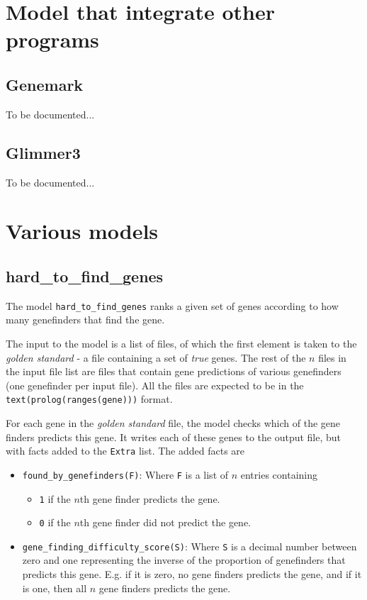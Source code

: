 \documentclass{book}
\begin{document}
\section{Model that integrate other programs}

\subsection{Genemark}

To be documented...

\subsection{Glimmer3}

To be documented...

\section{Various models}

\subsection{hard\_to\_find\_genes}

The model \texttt{hard\_to\_find\_genes} ranks a given set of genes
according to how many genefinders that find the gene.

The input to the model is a list of files, of which the first element
is taken to the \emph{golden standard} - a file containing a set of \emph{true} genes.
The rest of the $n$ files in the input file list are files that contain
gene predictions of various genefinders (one genefinder per input
file). All the files are expected to be in the
\texttt{text(prolog(ranges(gene)))} format.

For each gene in the \emph{golden standard} file, the model checks 
which of the gene finders predicts this gene. It writes each of these 
genes to the output file, but with facts added to the \texttt{Extra}
list. The added facts are 
\begin{itemize}
\item \texttt{found\_by\_genefinders(F)}: Where \texttt{F} is a list of $n$ entries
  containing
  \begin{itemize}
  \item \texttt{1} if the $n$th gene finder predicts the gene.
  \item \texttt{0} if the $n$th gene finder did not predict the gene.
  \end{itemize}
\item \texttt{gene\_finding\_difficulty\_score(S)}: Where \texttt{S}
  is a decimal number between zero and one representing the inverse of
  the proportion   of genefinders that predicts this gene. E.g. if it
  is zero, no gene finders predicts the gene, and if it is one, then
  all $n$ gene finders predicts the gene.
\end{itemize}
\end{document}
